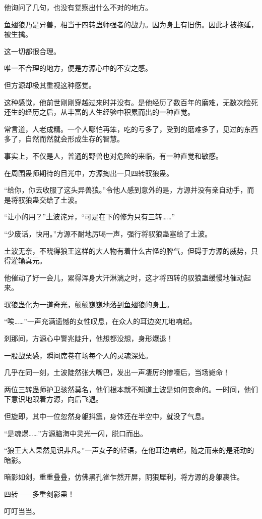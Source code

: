 \begin{this_body}
他询问了几句，也没有觉察出什么不对的地方。

鱼翅狼乃是异兽，相当于四转蛊师强者的战力。因为身上有旧伤。因此才被拖延，被生擒。

这一切都很合理。

唯一不合理的地方，便是方源心中的不安之感。

但方源却极其重视这种感觉。

这种感觉，他前世刚刚穿越过来时并没有。是他经历了数百年的磨难，无数次险死还生的经历之后，从丰富的人生经验中积累而出的一种直觉。

常言道，人老成精。一个人哪怕再笨，吃的亏多了，受到的磨难多了，见过的东西多了，自然而然就会形成生存的智慧。

事实上，不仅是人，普通的野兽也对危险的来临，有一种直觉和敏感。

在周围蛊师期待的目光中，方源掏出一只四转驭狼蛊。

“给你，你去收服了这头异兽狼。”令他人感到意外的是，方源并没有亲自动手，而是将驭狼蛊交给了土波。

“让小的用？”土波诧异，“可是在下的修为只有三转……”

“少废话，快用。”方源不耐地厉喝一声，强行将驭狼蛊塞给了土波。

土波无奈，不晓得狼王这样的大人物有着什么古怪的脾气，但碍于方源的威势，只得灌输真元。

他催动了好一会儿，累得浑身大汗淋漓之时，这才将四转的驭狼蛊缓慢地催动起来。

驭狼蛊化为一道奇光，颤颤巍巍地落到鱼翅狼的身上。

“唉……”一声充满遗憾的女性叹息，在众人的耳边突兀地响起。

刹那间，方源心中警兆陡升，他想都没想，身形爆退！

一股战栗感，瞬间席卷在场每个人的灵魂深处。

几乎在同一刻，土波陡然张大嘴巴，发出一声凄厉的惨嚎后，当场毙命！

两位三转蛊师护卫骇然莫名，他们根本就不知道土波是如何丧命的。一时间，他们下意识地跟着方源，向后飞退。

但旋即，其中一位忽然身躯抖震，身体还在半空中，就没了气息。

“是魂爆……”方源脑海中灵光一闪，脱口而出。

“狼王大人果然见识非凡。”一声女子的轻语，在他耳边响起，随之而来的是涌动的暗影。

暗影如剑，重重叠叠，仿佛黑孔雀乍然开屏，阴狠犀利，将方源的身躯裹住。

四转——多重剑影蛊！

叮叮当当。


\end{this_body}
